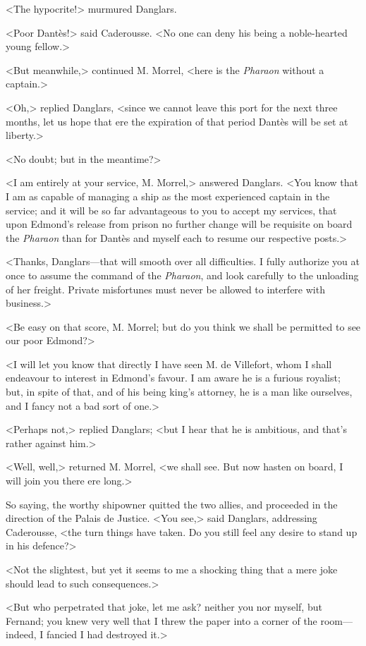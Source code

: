  <The hypocrite!> murmured Danglars. 

 <Poor Dantès!> said Caderousse. <No one can deny his being a noble-hearted young fellow.> 

 <But meanwhile,> continued M. Morrel, <here is the \textit{Pharaon} without a captain.> 

 <Oh,> replied Danglars, <since we cannot leave this port for the next three months, let us hope that ere the expiration of that period Dantès will be set at liberty.> 

 <No doubt; but in the meantime?> 

 <I am entirely at your service, M. Morrel,> answered Danglars. <You know that I am as capable of managing a ship as the most experienced captain in the service; and it will be so far advantageous to you to accept my services, that upon Edmond's release from prison no further change will be requisite on board the \textit{Pharaon} than for Dantès and myself each to resume our respective posts.> 

 <Thanks, Danglars—that will smooth over all difficulties. I fully authorize you at once to assume the command of the \textit{Pharaon}, and look carefully to the unloading of her freight. Private misfortunes must never be allowed to interfere with business.> 

 <Be easy on that score, M. Morrel; but do you think we shall be permitted to see our poor Edmond?> 

 <I will let you know that directly I have seen M. de Villefort, whom I shall endeavour to interest in Edmond's favour. I am aware he is a furious royalist; but, in spite of that, and of his being king's attorney, he is a man like ourselves, and I fancy not a bad sort of one.> 

 <Perhaps not,> replied Danglars; <but I hear that he is ambitious, and that's rather against him.> 

 <Well, well,> returned M. Morrel, <we shall see. But now hasten on board, I will join you there ere long.> 

 So saying, the worthy shipowner quitted the two allies, and proceeded in the direction of the Palais de Justice.  <You see,> said Danglars, addressing Caderousse, <the turn things have taken. Do you still feel any desire to stand up in his defence?> 

 <Not the slightest, but yet it seems to me a shocking thing that a mere joke should lead to such consequences.> 

 <But who perpetrated that joke, let me ask? neither you nor myself, but Fernand; you knew very well that I threw the paper into a corner of the room—indeed, I fancied I had destroyed it.> 

